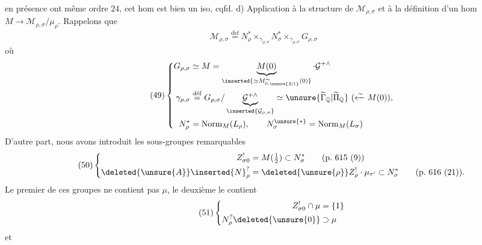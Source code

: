 en présence ont même ordre $24$, cet hom est bien un iso, cqfd.
d) Application à la structure de $\mathcal M_{\rho,\sigma}$ et à la définition d'un hom  $M\longrightarrow\mathcal M_{\rho,\sigma}/\mu_\rho$.
Rappelons que
\[
\tag{48}
\mathcal M_{\rho,\sigma}\overset{\mathrm{d\acute ef}}{=}
N_\rho^*\times_{\gamma_{\rho,\sigma}}N_\sigma^*\times_{\gamma_{\rho,\sigma}}G_{\rho,\sigma}
\]
où 
\[
\tag{49}
\left\{\begin{aligned}
G_{\rho,\sigma}&\simeq M=\underbrace{M(0)}_{\inserted{\simeq M_{0,\unsure{3|1}}^{\sim}(0)}}\cdot\mathcal G^{+\wedge}\\
\gamma_{\rho,\sigma}&\overset{\mathrm{d\acute ef}}{=}G_{\rho,\sigma}/\underbrace{\mathcal G^{+\wedge}}_{\inserted{\mathcal G_{\rho,\sigma}}}\simeq\unsure{\widetilde{\Gamma}_{\mathbb Q}|\widetilde{\Pi}_{\mathbb Q}}\ (\xleftarrow{\sim}M(0)),\\
N_\rho^*&=\operatorname{Norm}_M(L_\rho),\qquad N_\sigma^{\unsure{*}}=\operatorname{Norm}_M(L_\sigma)
\end{aligned}\right.
\]
D'autre part, nous avons introduit les sous-groupes remarquables
\[
\tag{50}
\left\{\begin{aligned}
Z_{\sigma0}^!&=M(\tfrac12)\subset N_\sigma^*\qquad(\mathrm{p.}\ 615\ (9))\\
\deleted{\unsure{A}}\inserted{N}_\rho^?&=\deleted{\unsure{\rho}}Z_\rho^!\cdot\mu_{\tau'}\subset N_\sigma^*\qquad(\mathrm{p.}\ 616\ (21)).
\end{aligned}\right.
\]
Le premier de ces groupes ne contient pas $\mu$, le deuxième le contient
\[
\tag{51}
\left\{\begin{aligned}
Z_{\sigma0}^!\cap\mu&=\{1\}\\
N_\rho^?\deleted{\unsure{0}}&\supset\mu
\end{aligned}\right.
\]
et

